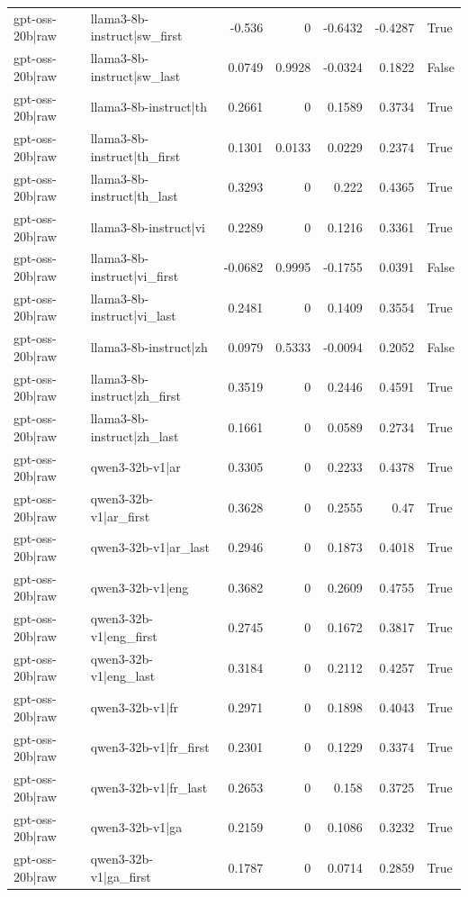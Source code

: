 \begin{table}
\begin{tabular}{l l r r r r l}
gpt-oss-20b|raw & llama3-8b-instruct|sw_first & -0.536 & 0 & -0.6432 & -0.4287 & True \\
gpt-oss-20b|raw & llama3-8b-instruct|sw_last & 0.0749 & 0.9928 & -0.0324 & 0.1822 & False \\
gpt-oss-20b|raw & llama3-8b-instruct|th & 0.2661 & 0 & 0.1589 & 0.3734 & True \\
gpt-oss-20b|raw & llama3-8b-instruct|th_first & 0.1301 & 0.0133 & 0.0229 & 0.2374 & True \\
gpt-oss-20b|raw & llama3-8b-instruct|th_last & 0.3293 & 0 & 0.222 & 0.4365 & True \\
gpt-oss-20b|raw & llama3-8b-instruct|vi & 0.2289 & 0 & 0.1216 & 0.3361 & True \\
gpt-oss-20b|raw & llama3-8b-instruct|vi_first & -0.0682 & 0.9995 & -0.1755 & 0.0391 & False \\
gpt-oss-20b|raw & llama3-8b-instruct|vi_last & 0.2481 & 0 & 0.1409 & 0.3554 & True \\
gpt-oss-20b|raw & llama3-8b-instruct|zh & 0.0979 & 0.5333 & -0.0094 & 0.2052 & False \\
gpt-oss-20b|raw & llama3-8b-instruct|zh_first & 0.3519 & 0 & 0.2446 & 0.4591 & True \\
gpt-oss-20b|raw & llama3-8b-instruct|zh_last & 0.1661 & 0 & 0.0589 & 0.2734 & True \\
gpt-oss-20b|raw & qwen3-32b-v1|ar & 0.3305 & 0 & 0.2233 & 0.4378 & True \\
gpt-oss-20b|raw & qwen3-32b-v1|ar_first & 0.3628 & 0 & 0.2555 & 0.47 & True \\
gpt-oss-20b|raw & qwen3-32b-v1|ar_last & 0.2946 & 0 & 0.1873 & 0.4018 & True \\
gpt-oss-20b|raw & qwen3-32b-v1|eng & 0.3682 & 0 & 0.2609 & 0.4755 & True \\
gpt-oss-20b|raw & qwen3-32b-v1|eng_first & 0.2745 & 0 & 0.1672 & 0.3817 & True \\
gpt-oss-20b|raw & qwen3-32b-v1|eng_last & 0.3184 & 0 & 0.2112 & 0.4257 & True \\
gpt-oss-20b|raw & qwen3-32b-v1|fr & 0.2971 & 0 & 0.1898 & 0.4043 & True \\
gpt-oss-20b|raw & qwen3-32b-v1|fr_first & 0.2301 & 0 & 0.1229 & 0.3374 & True \\
gpt-oss-20b|raw & qwen3-32b-v1|fr_last & 0.2653 & 0 & 0.158 & 0.3725 & True \\
gpt-oss-20b|raw & qwen3-32b-v1|ga & 0.2159 & 0 & 0.1086 & 0.3232 & True \\
gpt-oss-20b|raw & qwen3-32b-v1|ga_first & 0.1787 & 0 & 0.0714 & 0.2859 & True \\

\end{tabular}
\end{table}
